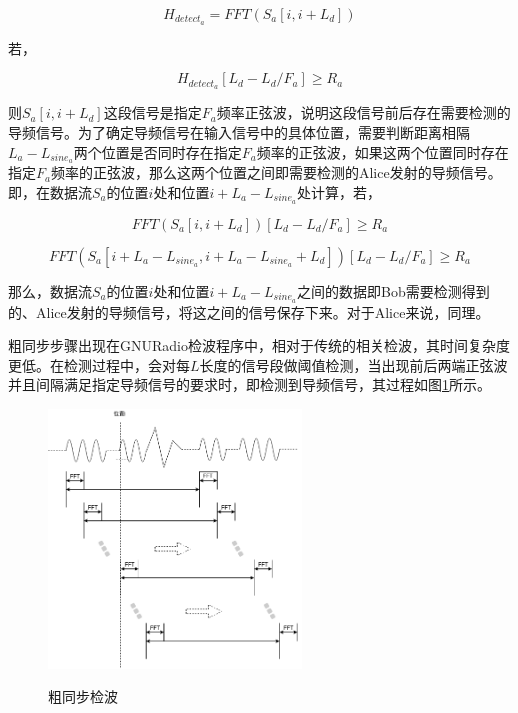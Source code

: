 \begin{equation}
    H_{detect_a} = FFT(S_a[i, i+L_d])
\end{equation}

若，

\begin{equation}
    H_{detect_a}[L_d - L_d / F_a] \geq R_a 
\end{equation}

则$S_a[i, i+L_d]$这段信号是指定$F_a$频率正弦波，说明这段信号前后存在需要检测的导频信号。为了确定导频信号在输入信号中的具体位置，需要判断距离相隔$L_a - L_{sine_a}$两个位置是否同时存在指定$F_a$频率的正弦波，如果这两个位置同时存在指定$F_a$频率的正弦波，那么这两个位置之间即需要检测的Alice发射的导频信号。即，在数据流$S_a$的位置$i$处和位置$i+L_a-L_{sine_a}$处计算，若，

\begin{equation}
    FFT(S_a[i, i+L_d])[L_d - L_d / F_a] \geq R_a 
\end{equation}

\begin{equation}
    FFT(S_a[i+L_a-L_{sine_a}, i+L_a-L_{sine_a}+L_d])[L_d - L_d / F_a] \geq R_a 
\end{equation}

那么，数据流$S_a$的位置$i$处和位置$i+L_a-L_{sine_a}$之间的数据即Bob需要检测得到的、Alice发射的导频信号，将这之间的信号保存下来。对于Alice来说，同理。

粗同步步骤出现在GNURadio检波程序中，相对于传统的相关检波，其时间复杂度更低。在检测过程中，会对每$L$长度的信号段做阈值检测，当出现前后两端正弦波并且间隔满足指定导频信号的要求时，即检测到导频信号，其过程如图\ref{detect_wave_algm}所示。

\begin{figure}
    \centering
    \includegraphics[width=0.6\textwidth]{images/detect_wave_algm}
    \caption{粗同步检波}{} %
    \label{detect_wave_algm}
\end{figure}


